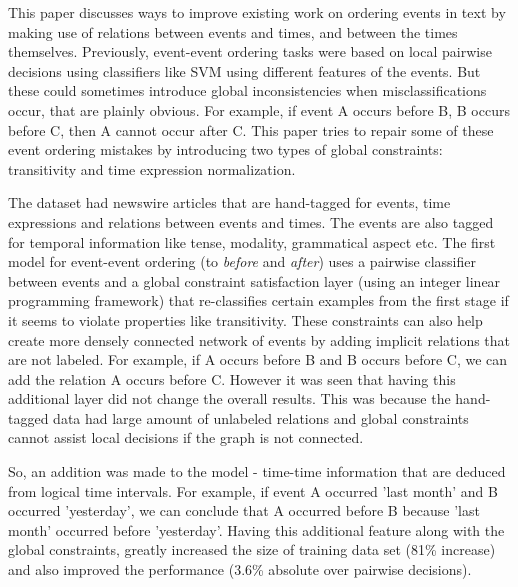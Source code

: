 


This paper discusses ways to improve existing work on ordering events
in text by making use of relations between events and times,
and between the times themselves. Previously, event-event ordering tasks were based on local pairwise decisions
using classifiers like SVM using different features of the events. But these could sometimes introduce global
inconsistencies when misclassifications occur, that are plainly obvious. For example, if
event A occurs before B, B occurs before C, then A cannot occur after C. This paper tries
to repair some of these event ordering mistakes by introducing two types of global
constraints: transitivity and time expression normalization. 

The dataset had newswire articles that are hand-tagged for events, time expressions and
relations between events and times. The events are also tagged for temporal information
like tense, modality, grammatical aspect etc. The first model for event-event ordering (to
{\em before} and {\em after}) uses a pairwise classifier between events and a
global constraint satisfaction layer (using an integer linear programming framework) that
re-classifies certain examples from the first stage if it seems to violate properties like
transitivity. These constraints can also help create more densely connected network of
events by adding implicit relations that are not labeled. For example, if A occurs before
B and B occurs before C, we can add the relation A occurs before C. However it was seen
that having this additional layer did not change the overall results. This was because the
hand-tagged data had large amount of unlabeled relations and global constraints cannot
assist local decisions if the graph is not connected.

So, an addition was made to the model - time-time information that are deduced from
logical time intervals. For example, if event A occurred 'last month' and B occurred
'yesterday', we can conclude that A occurred before B because 'last month' occurred before
'yesterday'. Having this additional feature along with the global constraints, greatly
increased the size of  training data set (81\% increase) and also improved the performance
(3.6\% absolute over pairwise decisions).\\



